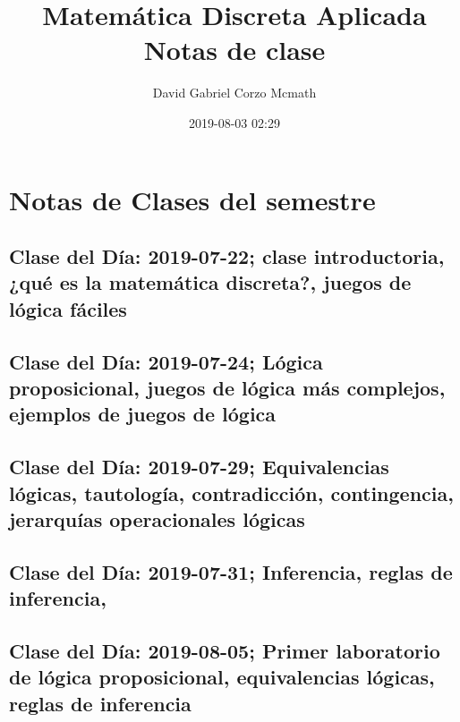 \documentclass[openany]{book}
\author{David Gabriel Corzo Mcmath}
\title{Matemática Discreta Aplicada \\ \normalsize Notas de clase}
\date{2019-08-03 02:29}
\begin{document}
\maketitle
\tableofcontents


\part{Notas de Clases del semestre}
\chapter{Clase del Día: 2019-07-22; clase introductoria, ¿qué es la matemática discreta?, juegos de lógica fáciles}


\chapter{Clase del Día: 2019-07-24; Lógica proposicional, juegos de lógica más complejos, ejemplos de juegos de lógica}



\chapter{Clase del Día: 2019-07-29; Equivalencias lógicas, tautología, contradicción, contingencia, jerarquías operacionales lógicas}



\chapter{Clase del Día: 2019-07-31; Inferencia, reglas de inferencia, }




\chapter{Clase del Día: 2019-08-05; Primer laboratorio de lógica proposicional, equivalencias lógicas, reglas de inferencia}

\end{document}
